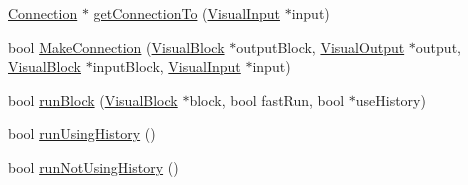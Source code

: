\begin{CompactItemize}
\item 
\hyperlink{classConnection}{Connection} $\ast$ \hyperlink{classPIWOEngine_7d7bed1c6a1f91bd7c3c4ca7ac696bc9}{getConnectionTo} (\hyperlink{classVisualInput}{VisualInput} $\ast$input)
\item 
bool \hyperlink{classPIWOEngine_e993fd1568a25f8ce5e3719212871ae5}{MakeConnection} (\hyperlink{classVisualBlock}{VisualBlock} $\ast$outputBlock, \hyperlink{classVisualOutput}{VisualOutput} $\ast$output, \hyperlink{classVisualBlock}{VisualBlock} $\ast$inputBlock, \hyperlink{classVisualInput}{VisualInput} $\ast$input)
\item 
bool \hyperlink{classPIWOEngine_ea240e8aed286fe05d3baf086d9d9c85}{runBlock} (\hyperlink{classVisualBlock}{VisualBlock} $\ast$block, bool fastRun, bool $\ast$useHistory)
\item 
bool \hyperlink{classPIWOEngine_f4a1573d29015d4fa8c1a1e37df86de3}{runUsingHistory} ()
\item 
bool \hyperlink{classPIWOEngine_302753a45663305fcef14a5c8c348a02}{runNotUsingHistory} ()
\end{CompactItemize}
